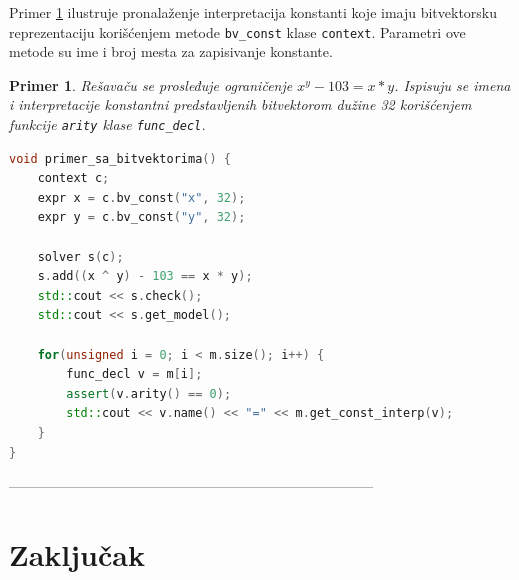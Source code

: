 \documentclass[12pt,oneside]{memoir}
\newtheorem{primer}{Primer}
\begin{document}
Primer \ref{ex6} ilustruje pronalaženje interpretacija konstanti koje imaju bitvektorsku reprezentaciju korišćenjem metode \texttt{bv\_const} klase \texttt{context}. Parametri ove metode su ime i broj mesta za zapisivanje konstante. 
\begin{primer} \label{ex6} 
Rešavaču se prosleđuje ograničenje $x^y - 103 = x*y$. 
Ispisuju se imena i interpretacije konstantni predstavljenih bitvektorom dužine 32 korišćenjem funkcije \texttt{arity} klase \texttt{func\_decl}.
\begin{lstlisting}[language=C++]
void primer_sa_bitvektorima() {
    context c;
    expr x = c.bv_const("x", 32);
    expr y = c.bv_const("y", 32);

    solver s(c);
    s.add((x ^ y) - 103 == x * y);
    std::cout << s.check();
    std::cout << s.get_model();
    
    for(unsigned i = 0; i < m.size(); i++) {
        func_decl v = m[i];
        assert(v.arity() == 0); 
        std::cout << v.name() << "=" << m.get_const_interp(v);
    }
}

\end{lstlisting}
\end{primer}



------------------------------------------------------------------------------

\chapter{Zaključak}


\literatura

\backmatter

\begin{biografija}
  
\end{biografija}
\end{document}
